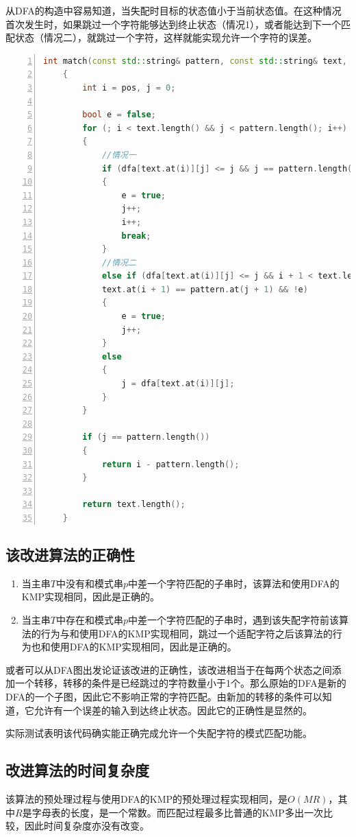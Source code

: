 \documentclass[a4paper]{article}
\begin{document}
	从DFA的构造中容易知道，当失配时目标的状态值小于当前状态值。在这种情况首次发生时，如果跳过一个字符能够达到终止状态（情况1），或者能达到下一个匹配状态（情况二），就跳过一个字符，这样就能实现允许一个字符的误差。
	
	\begin{lstlisting}[language=C++,numbers=left,style=CppStyle,caption=允许一个错误的KMP匹配算法,label={code:allow1error}]
	int match(const std::string& pattern, const std::string& text, int pos)
	{
		int i = pos, j = 0;
		
		bool e = false;
		for (; i < text.length() && j < pattern.length(); i++)
		{
			//情况一
			if (dfa[text.at(i)][j] <= j && j == pattern.length() - 1)
			{
				e = true;
				j++;
				i++;
				break;
			}
			//情况二
			else if (dfa[text.at(i)][j] <= j && i + 1 < text.length() && j + 1 < pattern.length() &&
			text.at(i + 1) == pattern.at(j + 1) && !e)
			{
				e = true;
				j++;
			}
			else
			{
				j = dfa[text.at(i)][j];
			}
		}
		
		if (j == pattern.length())
		{
			return i - pattern.length();
		}
		
		return text.length();
	}
	\end{lstlisting}

	\subsection{该改进算法的正确性}
	
	\begin{enumerate}
		\item 当主串$T$中没有和模式串$p$中差一个字符匹配的子串时，该算法和使用DFA的KMP实现相同，因此是正确的。
		\item 当主串$T$中存在和模式串$p$中差一个字符匹配的子串时，遇到该失配字符前该算法的行为与和使用DFA的KMP实现相同，跳过一个适配字符之后该算法的行为也和使用DFA的KMP实现相同，因此是正确的。
	\end{enumerate}

	或者可以从DFA图出发论证该改进的正确性，该改进相当于在每两个状态之间添加一个转移，转移的条件是已经跳过的字符数量小于1个。那么原始的DFA是新的DFA的一个子图，因此它不影响正常的字符匹配。由新加的转移的条件可以知道，它允许有一个误差的输入到达终止状态。因此它的正确性是显然的。

	实际测试表明该代码确实能正确完成允许一个失配字符的模式匹配功能。
	
	\subsection{改进算法的时间复杂度}
	该算法的预处理过程与使用DFA的KMP的预处理过程实现相同，是$O(MR)$，其中$R$是字母表的长度，是一个常数。而匹配过程最多比普通的KMP多出一次比较，因此时间复杂度亦没有改变。
\end{document}
